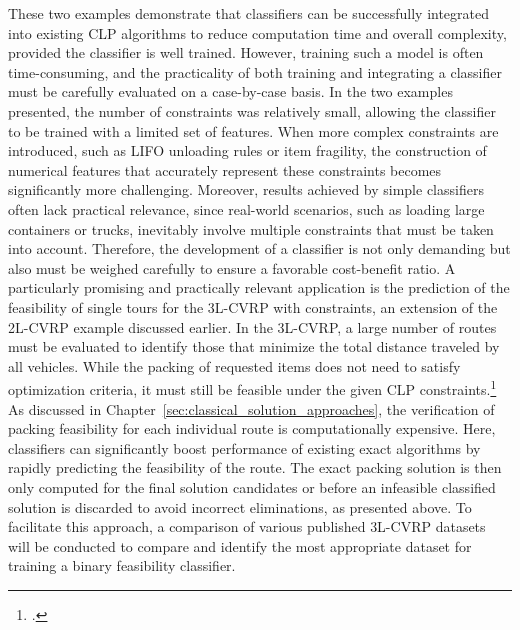 These two examples demonstrate that classifiers can be successfully integrated into existing \gls{CLP}
algorithms to reduce computation time and overall complexity, provided the classifier is well trained.
However, training such a model is often time-consuming, and the practicality of both training and
integrating a classifier must be carefully evaluated on a case-by-case basis.
In the two examples presented, the number of constraints was relatively small, allowing the classifier
to be trained with a limited set of features. When more complex constraints are introduced, such as
\gls{LIFO} unloading rules or item fragility, the construction of numerical features that accurately
represent these constraints becomes significantly more challenging.
Moreover, results achieved by simple classifiers often lack practical relevance, since real-world
scenarios, such as loading large containers or trucks, inevitably involve multiple constraints that
must be taken into account. Therefore, the development of a classifier is not only demanding but also
must be weighed carefully to ensure a favorable cost-benefit ratio.
A particularly promising and practically relevant application is the prediction of the feasibility of single tours for the
\gls{3L-CVRP} with constraints, an extension of the \gls{2L-CVRP} example discussed earlier. In the
\gls{3L-CVRP}, a large number of routes must be evaluated to identify those that minimize the total
distance traveled by all vehicles. While the packing of requested items does not need to satisfy
optimization criteria, it must still be feasible under the given \gls{CLP} constraints.\footcite[cf.][]{tamke_branch-and-cut_2024}
As discussed in Chapter~\ref{sec:classical_solution_approaches}, the verification of
packing feasibility for each individual route is computationally expensive.
Here, classifiers can significantly boost performance of existing exact algorithms by rapidly predicting the feasibility of the route. The
exact packing solution is then only computed for the final solution candidates or before an infeasible classified solution
is discarded to avoid incorrect eliminations, as presented above.
To facilitate this approach, a comparison of various published \gls{3L-CVRP} datasets will be conducted
to compare and identify the most appropriate dataset for training a binary feasibility classifier.